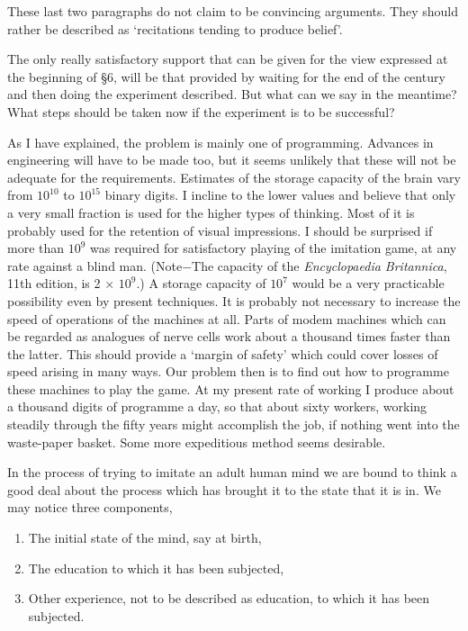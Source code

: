 \documentclass[12pt]{article}
\begin{document}
    These last two paragraphs do not claim to be convincing arguments. They should rather be described as ‘recitations tending to produce belief'.

    The only really satisfactory support that can be given for the view expressed at the beginning of \S 6, will be that provided by waiting for the end of the century and then doing the experiment described. But what can we say in the meantime? What steps should be taken now if the experiment is to be successful?

    As I have explained, the problem is mainly one of programming. Advances in engineering will have to be made too, but it seems unlikely that these will not be adequate for the requirements. Estimates of the storage capacity of the brain vary from $10^{10}$ to $10^{15}$ binary digits. I incline to the lower values and believe that only a very small fraction is used for the higher types of thinking. Most of it is probably used for the retention of visual impressions. I should be surprised if more than $10^9$ was required for satisfactory playing of the imitation game, at any rate against a blind man. (Note$-$The capacity of the \textit{Encyclopaedia Britannica}, 11th edition, is 2 $\times$ $10^9$.) A storage capacity of $10^7$ would be a very practicable possibility even by present techniques. It is probably not necessary to increase the speed of operations of the machines at all. Parts of modem machines which can be regarded as analogues of nerve cells work about a thousand times faster than the latter. This should provide a ‘margin of safety' which could cover losses of speed arising in many ways. Our problem then is to find out how to programme these machines to play the game. At my present rate of working I produce about a thousand digits of programme a day, so that about sixty workers, working steadily through the fifty years might accomplish the job, if nothing went into the waste-paper basket. Some more expeditious method seems desirable.

    In the process of trying to imitate an adult human mind we are bound to think a good deal about the process which has brought it to the state that it is in. We may notice three components,
    \begin{enumerate}[label=(\alph*)]
        \item{The initial state of the mind, say at birth,}
        \item{The education to which it has been subjected,}
        \item{Other experience, not to be described as education, to which it has been subjected.}
    \end{enumerate}
\end{document}
